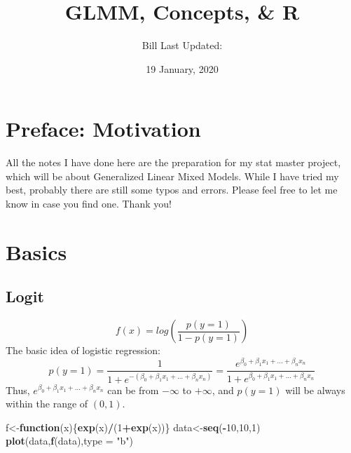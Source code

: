 \documentclass[]{book}
\title{GLMM, Concepts, \& R}
\author{Bill Last Updated:}
\date{19 January, 2020}
\newenvironment{Shaded}{\begin{snugshade}}{\end{snugshade}}
\newcommand{\KeywordTok}[1]{\textcolor[rgb]{0.13,0.29,0.53}{\textbf{#1}}}
\newcommand{\DataTypeTok}[1]{\textcolor[rgb]{0.13,0.29,0.53}{#1}}
\newcommand{\DecValTok}[1]{\textcolor[rgb]{0.00,0.00,0.81}{#1}}
\newcommand{\StringTok}[1]{\textcolor[rgb]{0.31,0.60,0.02}{#1}}
\newcommand{\ControlFlowTok}[1]{\textcolor[rgb]{0.13,0.29,0.53}{\textbf{#1}}}
\newcommand{\OperatorTok}[1]{\textcolor[rgb]{0.81,0.36,0.00}{\textbf{#1}}}
\newcommand{\NormalTok}[1]{#1}
\begin{document}
\maketitle

{
\setcounter{tocdepth}{1}
\tableofcontents
}
\chapter*{Preface: Motivation}\label{my-section}

All the notes I have done here are the preparation for my stat master
project, which will be about Generalized Linear Mixed Models. While I
have tried my best, probably there are still some typos and errors.
Please feel free to let me know in case you find one. Thank you!

\chapter{Basics}\label{basics}

\section{Logit}\label{logit}

\[f(x)=log(\frac{p(y=1)}{1-p(y=1)})\] The basic idea of logistic
regression:
\[p(y=1)=\frac{1}{1+e^{-(\beta_0+\beta_1x_1+...+\beta_nx_n)}}=\frac{e^{\beta_0+\beta_1x_1+...+\beta_nx_n}}{1+e^{\beta_0+\beta_1x_1+...+\beta_nx_n}}\]
Thus, \(e^{\beta_0+\beta_1x_1+...+\beta_nx_n}\) can be from \(-\infty\)
to \(+\infty\), and \(p(y=1)\) will be always within the range of
\((0,1)\).

\begin{Shaded}
\begin{Highlighting}[]
\NormalTok{f<-}\ControlFlowTok{function}\NormalTok{(x)\{}\KeywordTok{exp}\NormalTok{(x)}\OperatorTok{/}\NormalTok{(}\DecValTok{1}\OperatorTok{+}\KeywordTok{exp}\NormalTok{(x))\}}
\NormalTok{data<-}\KeywordTok{seq}\NormalTok{(}\OperatorTok{-}\DecValTok{10}\NormalTok{,}\DecValTok{10}\NormalTok{,}\DecValTok{1}\NormalTok{)}
\KeywordTok{plot}\NormalTok{(data,}\KeywordTok{f}\NormalTok{(data),}\DataTypeTok{type =} \StringTok{"b"}\NormalTok{)}
\end{Highlighting}
\end{Shaded}
\end{document}
